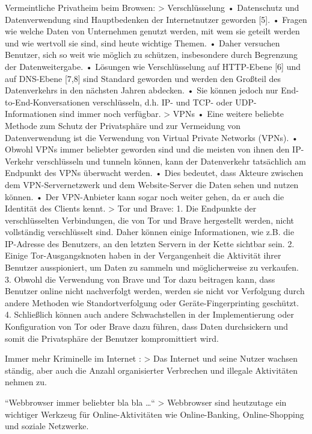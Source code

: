 Vermeintliche Privatheim beim Browsen: \cite{Perdices.2023}
	> Verschlüsselung
		•	Datenschutz und Datenverwendung sind Hauptbedenken der Internetnutzer geworden [5].
		•	Fragen wie welche Daten von Unternehmen genutzt werden, mit wem sie geteilt werden und wie wertvoll sie sind, sind heute wichtige Themen.
		•	Daher versuchen Benutzer, sich so weit wie möglich zu schützen, insbesondere durch Begrenzung der Datenweitergabe.
		•	Lösungen wie Verschlüsselung auf HTTP-Ebene [6] und auf DNS-Ebene [7,8] sind Standard geworden und werden den Großteil des Datenverkehrs in den nächsten Jahren abdecken.
		•	Sie können jedoch nur End-to-End-Konversationen verschlüsseln, d.h. IP- und TCP- oder UDP-Informationen sind immer noch verfügbar.
	> VPNs
		•	Eine weitere beliebte Methode zum Schutz der Privatsphäre und zur Vermeidung von Datenverwendung ist die Verwendung von Virtual Private Networks (VPNs).
		•	Obwohl VPNs immer beliebter geworden sind und die meisten von ihnen den IP-Verkehr verschlüsseln und tunneln können, kann der Datenverkehr tatsächlich am Endpunkt des VPNs überwacht werden.
		•	Dies bedeutet, dass Akteure zwischen dem VPN-Servernetzwerk und dem Website-Server die Daten sehen und nutzen können.
		•	Der VPN-Anbieter kann sogar noch weiter gehen, da er auch die Identität des Clients kennt.
	> Tor und Brave:
		1.	Die Endpunkte der verschlüsselten Verbindungen, die von Tor und Brave hergestellt werden, nicht vollständig verschlüsselt sind. Daher können einige Informationen, wie z.B. die IP-Adresse des Benutzers, an den letzten Servern in der Kette sichtbar sein.
		2.	Einige Tor-Ausgangsknoten haben in der Vergangenheit die Aktivität ihrer Benutzer ausspioniert, um Daten zu sammeln und möglicherweise zu verkaufen.
		3.	Obwohl die Verwendung von Brave und Tor dazu beitragen kann, dass Benutzer online nicht nachverfolgt werden, werden sie nicht vor Verfolgung durch andere Methoden wie Standortverfolgung oder Geräte-Fingerprinting geschützt.
		4.	Schließlich können auch andere Schwachstellen in der Implementierung oder Konfiguration von Tor oder Brave dazu führen, dass Daten durchsickern und somit die Privatsphäre der Benutzer kompromittiert wird.
		
	
	
	

Immer mehr Kriminelle im Internet \cite{Mahlous.2020}:
	> Das Internet und seine Nutzer wachsen ständig, aber auch die Anzahl organisierter Verbrechen und illegale Aktivitäten nehmen zu.

“Webbrowser immer beliebter bla bla …“ \cite{Izzati.2022}
	> Webbrowser sind heutzutage ein wichtiger Werkzeug für Online-Aktivitäten wie Online-Banking, Online-Shopping und soziale Netzwerke.

